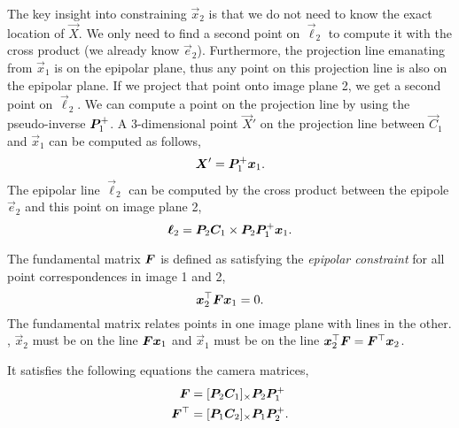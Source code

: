 The key insight into constraining $\vec{x}_2$ is that we do not need to know
the exact location of $\vec{X}$. We only need to find a second point on
$\vec{\ell}_2$ to compute it with the cross product (we already know
$\vec{e}_2$). Furthermore, the projection line emanating from $\vec{x}_1$ is on
the epipolar plane, thus any point on this projection line is also on the
epipolar plane. If we project that point onto image plane 2, we get a second
point on $\vec{\ell}_2$. We can compute a point on the projection line by using
the pseudo-inverse $\bm{P}_1^+$. A
3-dimensional point $\vec{X}'$ on the projection line between $\vec{C}_1$ and
$\vec{x}_1$ can be computed as follows, \[
  \bm{X}' = \bm{P}_1^+ \bm{x}_1
.\]
The epipolar line $\vec{\ell}_2$ can be computed by the cross product between
the epipole $\vec{e}_2$ and this point on image plane 2, \[
  \bm{\ell}_2 = \bm{P}_2 \bm{C}_1 \times \bm{P}_2 \bm{P}_1^+ \bm{x}_1
.\]


\begin{definition}
  \label{def:fundamental-matrix}

  The fundamental matrix $\bm{F}$ is defined as satisfying the
  \textit{epipolar constraint} for all point correspondences in image 1 and
  2, \[
    \bm{x}_2^\top \bm{F} \bm{x}_1 = 0
  .\]
  The fundamental matrix relates points in one image plane with lines in the
  other. \Ie, $\vec{x}_2$ must be on the line $\bm{F} \bm{x}_1$ and
  $\vec{x}_1$ must be on the line $\bm{x}_2^\top \bm{F} =
  \bm{F}^\top \bm{x}_2$.

  It satisfies the following equations \wrt the camera matrices,
  \begin{align*}
    \bm{F} &= [\bm{P}_2 \bm{C}_1]_\times \bm{P}_2 \bm{P}_1^+ \\
    \bm{F}^\top &= [\bm{P}_1 \bm{C}_2]_\times \bm{P}_1 \bm{P}_2^+
  .\end{align*}
\end{definition}

